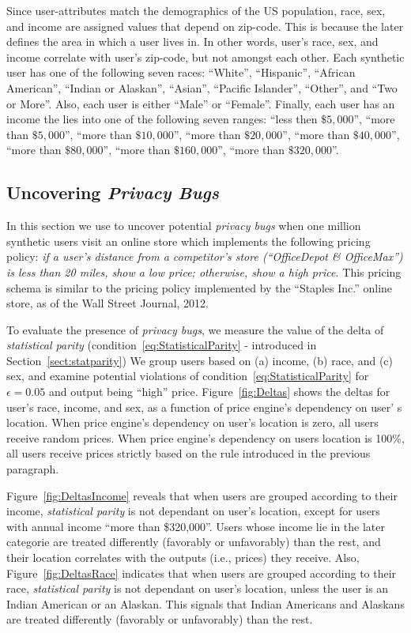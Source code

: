 Since user-attributes match the demographics of the US population,
race, sex, and income are assigned values that depend on zip-code. This is
because
the later defines the area in which a user lives in. In other words, user's race,
sex, and income correlate with user's zip-code, but not amongst each other.
Each synthetic user has
one of the following seven races: ``White'', ``Hispanic'', ``African
American'', ``Indian or Alaskan'', ``Asian'', ``Pacific Islander'', ``Other'',
and ``Two or More''. Also, each user is either ``Male'' or ``Female''. Finally,
each user has an income the lies into one of the following seven ranges:
``less then $\$5,000$'', ``more than $\$5,000$'', ``more than $\$10,000$'',
``more than $\$20,000$'', ``more than $\$40,000$'', ``more than $\$80,000$'',
``more than $\$160,000$'', ``more than $\$320,000$''.

\subsection{\normalsize Uncovering {\em Privacy Bugs}}
\label{sect:uncovering}
In this section we use \sysname to uncover potential {\em privacy bugs}
when one million synthetic users visit an online store which
implements the following pricing policy:
{\it if a user's distance from a competitor's store
(``OfficeDepot \& OfficeMax'') is less than 20 miles, show a low price;
otherwise, show a high price.} This pricing schema is similar to the pricing
policy implemented by the ``Staples Inc.'' online store, as of the Wall Street
Journal, 2012.

To evaluate the presence of {\em privacy bugs}, we measure the
value of the delta of {\em statistical parity}
(condition~\ref{eq:StatisticalParity} -
introduced in Section~\ref{sect:statparity})
We group users based on (a) income, (b) race, and (c) sex, and examine potential
violations of condition~\ref{eq:StatisticalParity} for $\epsilon=0.05$ and
output being ``high'' price. Figure~\ref{fig:Deltas} shows the deltas
for user's race, income, and sex, as a function of price engine's dependency
on user' s location. When price engine's dependency on user's location is zero,
all users receive random prices. When price engine's dependency on users
location is 100\%, all users receive prices strictly based on the rule
introduced in the previous paragraph.


Figure~\ref{fig:DeltasIncome} reveals that when users are grouped according to
their income, {\em statistical parity} is not dependant on user's location,
except for users with annual income ``more than \$320,000''. Users whose income
lie in the later categorie are treated differently (favorably or unfavorably)
than the rest, and their location correlates with the outputs (i.e., prices)
they receive. Also, Figure~\ref{fig:DeltasRace} indicates that when users are
grouped according to their race, {\em statistical parity} is not dependant on
user's location, unless the user is an Indian American or an Alaskan.
This signals that Indian Americans and Alaskans are treated differently
(favorably or unfavorably) than the rest.

